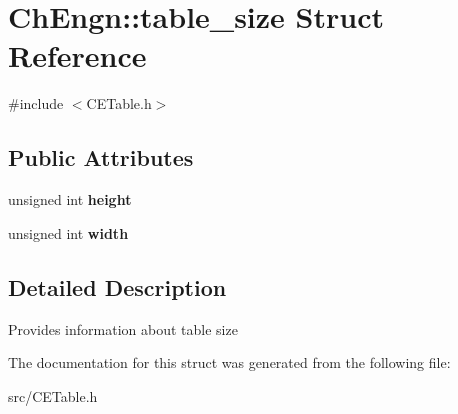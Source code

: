 \hypertarget{structChEngn_1_1table__size}{
\section{ChEngn::table\_\-size Struct Reference}
\label{structChEngn_1_1table__size}
}


{\ttfamily \#include $<$CETable.h$>$}

\subsection*{Public Attributes}
\begin{DoxyCompactItemize}
\item 
\hypertarget{structChEngn_1_1table__size_a46d85ce1d0feba8f8efb618e8ad5d938}{
unsigned int {\bfseries height}}
\label{structChEngn_1_1table__size_a46d85ce1d0feba8f8efb618e8ad5d938}

\item 
\hypertarget{structChEngn_1_1table__size_aaf5f89ec7c6a2de514cfe4a1a606b8be}{
unsigned int {\bfseries width}}
\label{structChEngn_1_1table__size_aaf5f89ec7c6a2de514cfe4a1a606b8be}

\end{DoxyCompactItemize}


\subsection{Detailed Description}
Provides information about table size 

The documentation for this struct was generated from the following file:\begin{DoxyCompactItemize}
\item 
src/CETable.h\end{DoxyCompactItemize}
